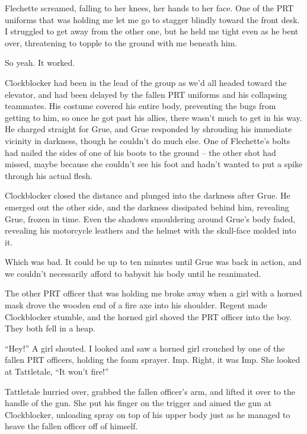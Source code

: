 Flechette screamed, falling to her knees, her hands to her face.  One of the PRT uniforms that was holding me let me go to stagger blindly toward the front desk.  I struggled to get away from the other one, but he held me tight even as he bent over, threatening to topple to the ground with me beneath him.



So yeah.  It worked.



Clockblocker had been in the lead of the group as we'd all headed toward the elevator, and had been delayed by the fallen PRT uniforms and his collapsing teammates.  His costume covered his entire body, preventing the bugs from getting to him, so once he got past his allies, there wasn't much to get in his way.  He charged straight for Grue, and Grue responded by shrouding his immediate vicinity in darkness, though he couldn't do much else.  One of Flechette's bolts had nailed the sides of one of his boots to the ground – the other shot had missed, maybe because she couldn't see his foot and hadn't wanted to put a spike through his actual flesh.



Clockblocker closed the distance and plunged into the darkness after Grue.  He emerged out the other side, and the darkness dissipated behind him, revealing Grue, frozen in time.  Even the shadows smouldering around Grue's body faded, revealing his motorcycle leathers and the helmet with the skull-face molded into it.



Which was bad.  It could be up to ten minutes until Grue was back in action, and we couldn't necessarily afford to babysit his body until he reanimated.



The other PRT officer that was holding me broke away when a girl with a horned mask drove the wooden end of a fire axe into his shoulder.  Regent made Clockblocker stumble, and the horned girl shoved the PRT officer into the boy.  They both fell in a heap.



``Hey!'' A girl shouted.  I looked and saw a horned girl crouched by one of the fallen PRT officers, holding the foam sprayer.  Imp.  Right, it was Imp.  She looked at Tattletale, ``It won't fire!''



Tattletale hurried over, grabbed the fallen officer's arm, and lifted it over to the handle of the gun.  She put his finger on the trigger and aimed the gun at Clockblocker, unloading spray on top of his upper body just as he managed to heave the fallen officer off of himself.



